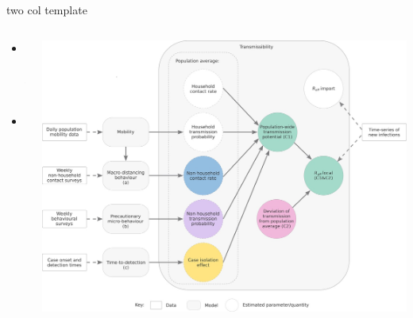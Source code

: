 \documentclass[
  ignorenonframetext,
]{beamer}
\providecommand{\tightlist}{%
  \setlength{\itemsep}{0pt}\setlength{\parskip}{0pt}}\usepackage{longtable,booktabs,array}
\begin{document}
\begin{frame}{two col template}
\label{two-col-template}
\begin{columns}[T]
\begin{column}{0.48\textwidth}
\begin{itemize}
\tightlist
\item
  text
\item
  more
\end{itemize}
\end{column}

\begin{column}{0.48\textwidth}
\includegraphics{images/tp_model_schema.jpg}
\end{column}
\end{columns}
\end{frame}
\end{document}
